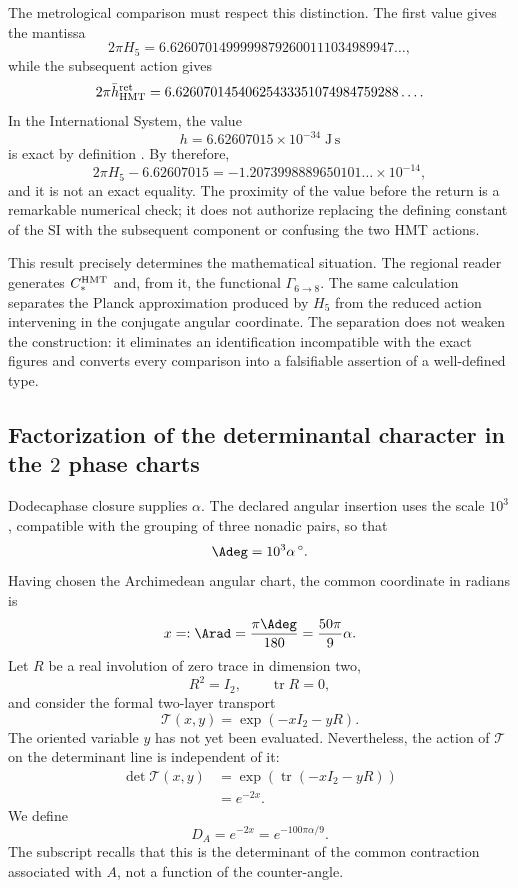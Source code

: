 The metrological comparison must respect this distinction. The first value gives
the mantissa
\[
2\pi H_5
=6.62607014999998792600111034989947\ldots,
\]
while the subsequent action gives
\[
2\pi\bar h_{\rm HMT}^{\rm ret}
=6.62607014540625433351074984759288\ldots.
\]
In the International System, the value
\[
h=6.62607015\times10^{-34}\;\mathrm{J\,s}
\]
is exact by definition \cite{BIPMSI}. By therefore,
\[
2\pi H_5-6.62607015
=-1.2073998889650101\ldots\times10^{-14},
\]
and it is not an exact equality. The proximity of the value before the return is
a remarkable numerical check; it does not authorize replacing the defining constant
of the SI with the subsequent component or confusing the two HMT actions\@.

This result precisely determines the mathematical situation. The regional
reader generates \(C_*^{\rm HMT}\) and, from it, the functional
\(\Gamma_{6\to8}\). The same calculation separates the Planck approximation
produced by \(H_5\) from the reduced action intervening in
the conjugate angular coordinate. The separation does not weaken the construction: it eliminates an
identification incompatible with the exact figures and converts every
comparison into a falsifiable assertion of a well-defined type.

\subsection{Factorization of the determinantal character in the \texorpdfstring{\(2\)}{2} phase charts}
\label{sec:s102:c38:3:4}


Dodecaphase closure supplies \(\alpha\). The declared angular insertion
uses the scale \(10^3\), compatible with the grouping of three nonadic
pairs, so that
\[
\Adeg=10^3\alpha\,{}^\circ.
\]
Having chosen the Archimedean angular chart, the common coordinate in radians is
\[
x=: \Arad=\frac{\pi\Adeg}{180}=\frac{50\pi}{9}\alpha.
\]
Let \(R\) be a real involution of zero trace in dimension two,
\[
R^2=I_2,
\qquad
\operatorname{tr}R=0,
\]
and consider the formal two-layer transport
\[
\mathcal T(x,y)=\exp(-xI_2-yR).
\]
The oriented variable \(y\) has not yet been evaluated. Nevertheless, the action
of \(\mathcal T\) on the determinant line is independent of it:
\[
\begin{aligned}
\det\mathcal T(x,y)
&=\exp\!\left(\operatorname{tr}(-xI_2-yR)\right)\\
&=e^{-2x}.
\end{aligned}
\]
We define
\[
\boxed{
D_A=e^{-2x}=e^{-100\pi\alpha/9}.}
\]
The subscript recalls that this is the determinant of the common contraction
associated with \(A\), not a function of the counter-angle.

